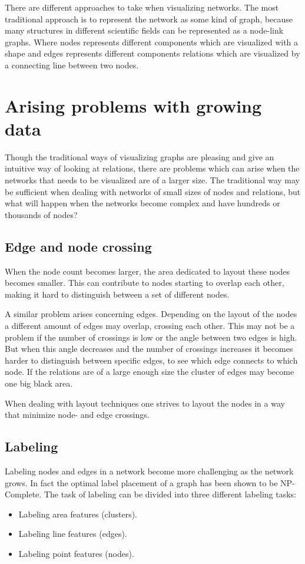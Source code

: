 \documentclass[a4paper,11pt]{kth-mag}
\begin{document}
There are different approaches to take when visualizing networks. The most traditional approach is to represent the network as some kind of graph, because many structures in different scientific fields can be represented
as a node-link graphs. Where nodes represents different components which are visualized with a shape and edges represents different components relations which are visualized by a connecting line between two nodes.

\section{Arising problems with growing data}
Though the traditional ways of visualizing graphs are pleasing and give an intuitive way of looking at relations, there are problems which can arise when the networks that needs to be visualized are of a larger size. The traditional
way may be sufficient when dealing with networks of small sizes of nodes and relations, but what will happen when the networks become complex and have hundreds or thousands of nodes?
\subsection{Edge and node crossing}
When the node count becomes larger, the area dedicated to layout these nodes becomes smaller. This can contribute to nodes starting to overlap each other, making it hard to distinguish between a set of different nodes.

A similar problem arises concerning edges. Depending on the layout of the nodes a different amount of edges may overlap, crossing each other. This may not be a problem if the number of crossings is low or the angle between 
two edges is high. But when this angle decreases and the number of crossings increases it becomes harder to distinguish between specific edges, to see which edge connects to which node. If the relations are of a large enough size the cluster of edges
may become one big black area.

When dealing with layout techniques one strives to layout the nodes in a way that minimize node- and edge crossings.
\subsection{Labeling}
Labeling nodes and edges in a network become more challenging as the network grows. In fact the optimal label placement of a graph has been shown to be NP-Complete\cite{Marks91thecomputational}.
The task of labeling can be divided into three different labeling tasks:
\begin{itemize}
	\item{Labeling area features (clusters).}
	\item{Labeling line features (edges).}
	\item{Labeling point features (nodes).}
\end{itemize}
\end{document}
